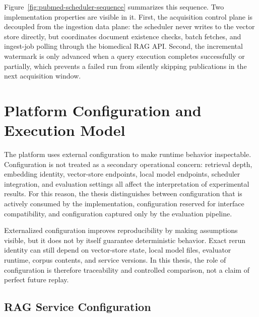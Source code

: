Figure~\ref{fig:pubmed-scheduler-sequence} summarizes this sequence. Two implementation properties are visible in it. First, the acquisition control plane is decoupled from the ingestion data plane: the scheduler never writes to the vector store directly, but coordinates document existence checks, batch fetches, and ingest-job polling through the biomedical RAG API. Second, the incremental watermark is only advanced when a query execution completes successfully or partially, which prevents a failed run from silently skipping publications in the next acquisition window.

\clearpage

\section{Platform Configuration and Execution Model}

The platform uses external configuration to make runtime behavior inspectable. Configuration is not treated as a secondary operational concern: retrieval depth, embedding identity, vector-store endpoints, local model endpoints, scheduler integration, and evaluation settings all affect the interpretation of experimental results. For this reason, the thesis distinguishes between configuration that is actively consumed by the implementation, configuration reserved for interface compatibility, and configuration captured only by the evaluation pipeline.

Externalized configuration improves reproducibility by making assumptions visible, but it does not by itself guarantee deterministic behavior. Exact rerun identity can still depend on vector-store state, local model files, evaluator runtime, corpus contents, and service versions. In this thesis, the role of configuration is therefore traceability and controlled comparison, not a claim of perfect future replay.

\subsection{RAG Service Configuration}

